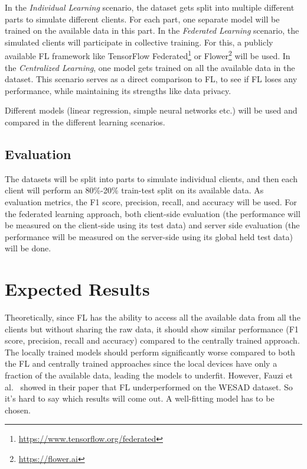 \documentclass[
   fontsize=10.5pt,
   invert-title=true,
   titlepage=false,
   titleimage-ratio=13,
   class=article,
   twocolumn,
   parskip=half-
]{bfhpub}				%
\begin{document}
In the \textit{Individual Learning} scenario, the dataset gets split into
multiple different parts to simulate different clients. For each part, one
separate model will be trained on the available data in this part. In the
\textit{Federated Learning} scenario, the simulated clients will participate in
collective training. For this, a publicly available FL framework like TensorFlow
Federated\footnote{\url{https://www.tensorflow.org/federated}}
or Flower\footnote{\url{https://flower.ai}} will be used. In the \textit{Centralized Learning}, one model gets trained
on all the available data in the dataset. This scenario serves as a direct
comparison to FL, to see if FL loses any performance, while maintaining its
strengths like data privacy.

Different models (linear regression, simple neural networks etc.) will be used
and compared in the different learning scenarios.

\subsection{Evaluation}
The datasets will be split into parts to simulate individual clients, and then
each client will perform an 80\%-20\% train-test split on its available data. As
evaluation metrics, the F1 score, precision, recall, and accuracy will be
used. For the federated learning approach, both client-side evaluation (the
performance will be measured on the client-side using its test data) and
server side evaluation (the
performance will be measured on the server-side using its global held test data) will be done.

\section{Expected Results}
Theoretically, since FL has the ability to access all the available data from all
the clients but without sharing the raw data, it should show similar
performance (F1 score, precision, recall and accuracy) compared to the
centrally trained approach. The locally trained models should perform
significantly worse compared to both the FL and centrally trained approaches
since the local devices have only a fraction of the available data, leading the models
to underfit. However, Fauzi et al.~\cite{fauzi_comparative_2022}
showed in their paper that FL underperformed on the WESAD dataset. So it's hard
to say which results will come out. A well-fitting model has to be chosen.
\end{document}
